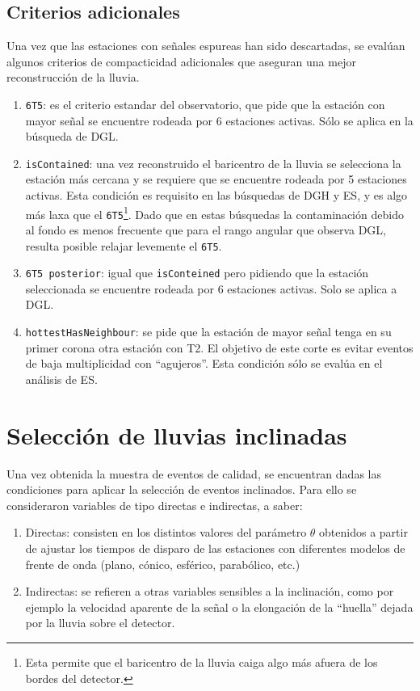 	
	\subsection{Criterios adicionales}
	
	Una vez que las estaciones con señales espureas han sido descartadas, se eval\'uan algunos criterios de compacticidad adicionales que aseguran una mejor reconstrucción de la lluvia.
	
	\begin{enumerate}
	 \item \texttt{6T5}: es el criterio estandar del observatorio, que pide que la estación con mayor señal se encuentre rodeada por 6 estaciones activas. Sólo se aplica en la búsqueda de DGL.
	 \item \texttt{isContained}: una vez reconstruido el baricentro de la lluvia se selecciona la estación m\'as cercana y se requiere que se encuentre rodeada por 5 estaciones activas. Esta condici\'on es requisito en las búsquedas de DGH y ES, y es algo más laxa que el \texttt{6T5}\footnote{Esta permite que el baricentro de la lluvia caiga algo más afuera de los bordes del detector.}. 
	 Dado que en estas búsquedas la contaminación debido al fondo es menos frecuente que para el rango angular que observa DGL, resulta posible relajar levemente el \texttt{6T5}.
	 \item \texttt{6T5 posterior}: igual que \texttt{isConteined} pero pidiendo que la estación seleccionada se encuentre rodeada por 6 estaciones activas. Solo se aplica a DGL.
	 \item \texttt{hottestHasNeighbour}: se pide que la estación de mayor señal tenga en su primer corona otra estación con T2. El objetivo de este corte es evitar eventos de baja multiplicidad con ``agujeros''. Esta condición s\'olo se eval\'ua en el análisis de ES.
	\end{enumerate}
	
\section{Selecci\'on de lluvias inclinadas}
\label{sc:inclinadosAuger}

Una vez obtenida la muestra de eventos de calidad, se encuentran dadas las condiciones para aplicar la selección de eventos inclinados.
Para ello se consideraron variables de tipo directas e indirectas, a saber:
\begin{enumerate}
 \item Directas: consisten en los distintos valores del parámetro $\theta$ obtenidos a partir de ajustar los tiempos de disparo de las estaciones con diferentes modelos de frente de onda (plano, cónico, esférico, parabólico, etc.)
 \item Indirectas: se refieren a otras variables sensibles a la inclinación, como por ejemplo la velocidad aparente de la señal o la elongación de la ``huella'' dejada por la lluvia sobre el detector.
\end{enumerate}
	

